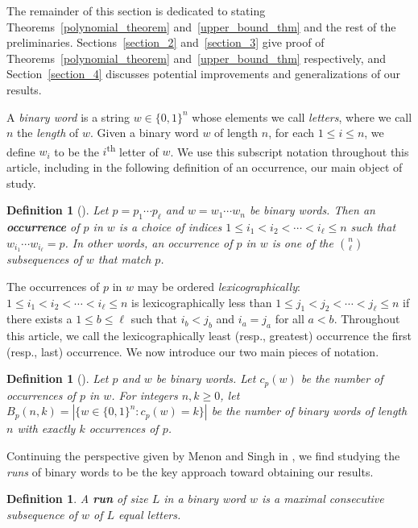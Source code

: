 \documentclass[11pt]{amsart}
\newtheorem{definition}[theorem]{Definition}
\begin{document}
The remainder of this section is dedicated to stating Theorems~\ref{polynomial_theorem} and~\ref{upper_bound_thm} and the rest of the preliminaries. Sections~\ref{section_2} and~\ref{section_3} give proof of Theorems~\ref{polynomial_theorem} and~\ref{upper_bound_thm} respectively, and Section~\ref{section_4} discusses potential improvements and generalizations of our results.

A \emph{binary word} is a string $w\in\{0,1\}^n$ whose elements we call \emph{letters}, where we call $n$ the \emph{length} of $w$. Given a binary word $w$ of length $n$, for each $1\leq i\leq n$, we define $w_i$ to be the $i$\textsuperscript{th} letter of $w$. We use this subscript notation throughout this article, including in the following definition of an occurrence, our main object of study.

\begin{definition}[{\cite[pg.2]{subseq_freq}}]
    Let $p=p_1\cdots p_{\ell}$ and $w=w_1\cdots w_n$ be binary words. Then an \textbf{occurrence} of $p$ in $w$ is a choice of indices $1\leq i_1<i_2<\cdots<i_{\ell}\leq n$ such that $w_{i_1}\cdots w_{i_{\ell}}=p$. In other words, an occurrence of $p$ in $w$ is one of the ${n\choose\ell}$ subsequences of $w$ that match $p$.
\end{definition}

The occurrences of $p$ in $w$ may be ordered \emph{lexicographically}: $1\leq i_1<i_2<\cdots<i_{\ell}\leq n$ is lexicographically less than $1\leq j_1<j_2<\cdots<j_{\ell}\leq n$ if there exists a $1\leq b\leq \ell$ such that $i_b<j_b$ and $i_a=j_a$ for all $a<b$. Throughout this article, we call the lexicographically least (resp., greatest) occurrence the first (resp., last) occurrence. We now introduce our two main pieces of notation.

\begin{definition}[{\cite[pg.2]{subseq_freq}}]
    Let $p$ and $w$ be binary words. Let $c_p(w)$ be the number of occurrences of $p$ in $w$. For integers $n,k\geq0$, let $B_p(n,k)=|\{w\in\{0,1\}^n:c_p(w)=k\}|$ be the number of binary words of length $n$ with exactly $k$ occurrences of $p$.
\end{definition}

Continuing the perspective given by Menon and Singh in \cite{subseq_freq}, we find studying the \emph{runs} of binary words to be the key approach toward obtaining our results.

\begin{definition}
    A \textbf{run} of size $L$ in a binary word $w$ is a maximal consecutive subsequence of $w$ of $L$ equal letters.
\end{definition}
\end{document}

